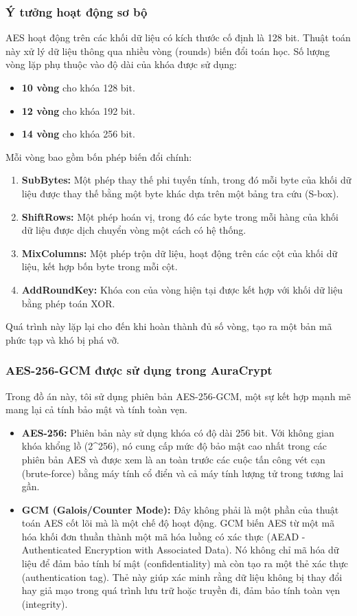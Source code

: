 \subsubsection{Ý tưởng hoạt động sơ bộ}
AES hoạt động trên các khối dữ liệu có kích thước cố định là 128 bit. Thuật toán này xử lý dữ liệu thông qua nhiều vòng (rounds) biến đổi toán học. Số lượng vòng lặp phụ thuộc vào độ dài của khóa được sử dụng:
\begin{itemize}
    \item \textbf{10 vòng} cho khóa 128 bit.
    \item \textbf{12 vòng} cho khóa 192 bit.
    \item \textbf{14 vòng} cho khóa 256 bit.
\end{itemize}
Mỗi vòng bao gồm bốn phép biến đổi chính:
\begin{enumerate}
    \item \textbf{SubBytes:} Một phép thay thế phi tuyến tính, trong đó mỗi byte của khối dữ liệu được thay thế bằng một byte khác dựa trên một bảng tra cứu (S-box).
    \item \textbf{ShiftRows:} Một phép hoán vị, trong đó các byte trong mỗi hàng của khối dữ liệu được dịch chuyển vòng một cách có hệ thống.
    \item \textbf{MixColumns:} Một phép trộn dữ liệu, hoạt động trên các cột của khối dữ liệu, kết hợp bốn byte trong mỗi cột.
    \item \textbf{AddRoundKey:} Khóa con của vòng hiện tại được kết hợp với khối dữ liệu bằng phép toán XOR.
\end{enumerate}
Quá trình này lặp lại cho đến khi hoàn thành đủ số vòng, tạo ra một bản mã phức tạp và khó bị phá vỡ.

\subsubsection{AES-256-GCM được sử dụng trong AuraCrypt}
Trong đồ án này, tôi sử dụng phiên bản AES-256-GCM, một sự kết hợp mạnh mẽ mang lại cả tính bảo mật và tính toàn vẹn.
\begin{itemize}
    \item \textbf{AES-256:} Phiên bản này sử dụng khóa có độ dài 256 bit. Với không gian khóa khổng lồ (2\textasciicircum 256), nó cung cấp mức độ bảo mật cao nhất trong các phiên bản AES và được xem là an toàn trước các cuộc tấn công vét cạn (brute-force) bằng máy tính cổ điển và cả máy tính lượng tử trong tương lai gần.
    \item \textbf{GCM (Galois/Counter Mode):} Đây không phải là một phần của thuật toán AES cốt lõi mà là một chế độ hoạt động. GCM biến AES từ một mã hóa khối đơn thuần thành một mã hóa luồng có xác thực (AEAD - Authenticated Encryption with Associated Data). Nó không chỉ mã hóa dữ liệu để đảm bảo tính bí mật (confidentiality) mà còn tạo ra một thẻ xác thực (authentication tag). Thẻ này giúp xác minh rằng dữ liệu không bị thay đổi hay giả mạo trong quá trình lưu trữ hoặc truyền đi, đảm bảo tính toàn vẹn (integrity).
\end{itemize}

